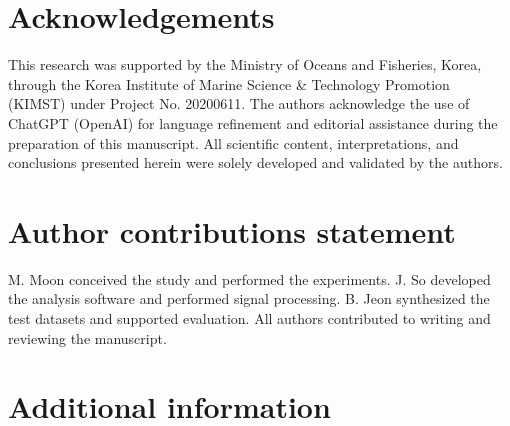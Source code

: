 \documentclass[10pt]{wlscirep}
\begin{document}
\section*{Acknowledgements}

This research was supported by the Ministry of Oceans and Fisheries, Korea, through the Korea Institute of Marine Science \& Technology Promotion (KIMST) under Project No. 20200611. The authors acknowledge the use of ChatGPT (OpenAI) for language refinement and editorial assistance during the preparation of this manuscript. All scientific content, interpretations, and conclusions presented herein were solely developed and validated by the authors.

\section*{Author contributions statement}
M. Moon conceived the study and performed the experiments. J. So developed the analysis software and performed signal processing. B. Jeon synthesized the test datasets and supported evaluation. All authors contributed to writing and reviewing the manuscript.



\section*{Additional information}


\end{document}
